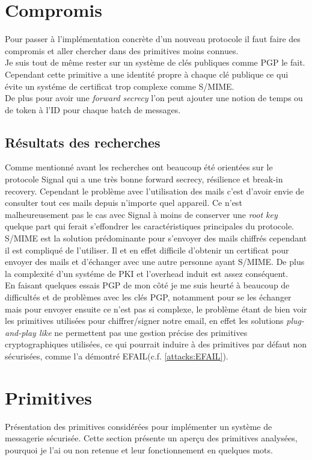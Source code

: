 \section{Compromis}
Pour passer à l'implémentation concrète d'un nouveau protocole il faut faire des compromis et aller chercher dans des primitives moins connues.\\
Je suis tout de même rester sur un système de clés publiques comme PGP le fait. Cependant cette primitive a une identité propre à chaque clé publique ce qui évite un systéme de certificat trop complexe comme S/MIME.\\
De plus pour avoir une \textit{forward secrecy} l'on peut ajouter une notion de temps ou de token à l'ID pour chaque batch de messages.
\subsection{Résultats des recherches}
Comme mentionné avant les recherches ont beaucoup été orientées sur le protocole Signal qui a une très bonne forward secrecy, résilience et break-in recovery. Cependant le problème avec l'utilisation des mails c'est d'avoir envie de consulter tout ces mails depuis n'importe quel appareil. Ce n'est malheureusement pas le cas avec Signal à moins de conserver une \textit{root key} quelque part qui ferait s'effondrer les caractéristiques principales du protocole.\\
S/MIME est la solution prédominante pour s'envoyer des mails chiffrés cependant il est compliqué de l'utiliser. Il et en effet difficile d'obtenir un certificat pour envoyer des mails et d'échanger avec une autre personne ayant S/MIME. De plus la complexité d'un systéme de PKI et l'overhead induit est assez conséquent.\\
En faisant quelques essais PGP de mon côté je me suis heurté à beaucoup de difficultés et de problèmes avec les clés PGP, notamment pour se les échanger mais pour envoyer ensuite ce n'est pas si complexe, le problème étant de bien voir les primitives utilisées pour chiffrer/signer notre email, en effet les solutions \textit{plug-and-play like} ne permettent pas une gestion précise des primitives cryptographiques utilisées, ce qui pourrait induire à des primitives par défaut non sécurisées, comme l'a démontré EFAIL(c.f. \ref{attacks:EFAIL}).
\section{Primitives}
Présentation des primitives considérées pour implémenter un système de messagerie sécurisée. Cette section présente un aperçu des primitives analysées, pourquoi je l'ai ou non retenue et leur fonctionnement en quelques mots.
